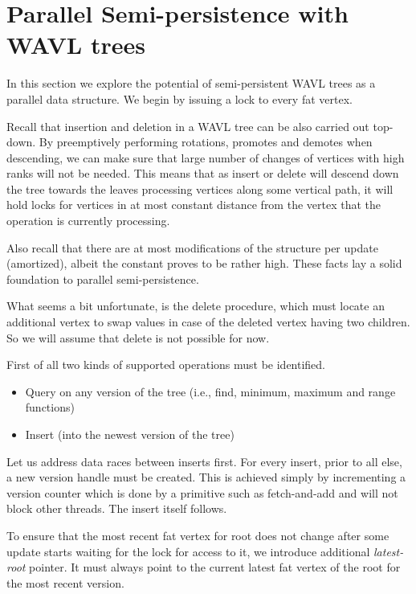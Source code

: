 \section{Parallel Semi-persistence with WAVL trees}

In this section we explore the potential of semi-persistent WAVL trees as a parallel data structure. 
We begin by issuing a lock to every fat vertex.

Recall that insertion and deletion in a WAVL tree can be also carried out top-down.
By preemptively performing rotations, promotes and demotes when descending, we can make sure that large number of changes of vertices with high ranks will not be needed. This means that as insert or delete will descend down the tree towards the leaves processing vertices along some vertical path, it will hold locks for vertices in at most constant distance from the vertex that the operation is currently processing.

Also recall that there are at most  modifications of the structure per update (amortized), albeit the constant proves to be rather high. These facts lay a solid foundation to parallel semi-persistence.

What seems a bit unfortunate, is the delete procedure, which must locate an additional vertex to swap values in case of the deleted vertex having two children. So we will assume that delete is not possible for now.

First of all two kinds of supported operations must be identified. 

\begin{itemize}
	\item Query on any version of the tree (i.e., find, minimum, maximum and range functions)
	\item Insert (into the newest version of the tree)
\end{itemize}

Let us address data races between inserts first. For every insert, prior to all else, a new version handle must be created. This is achieved simply by incrementing a version counter which is done by a primitive such as fetch-and-add and will not block other threads. The insert itself follows.

To ensure that the most recent fat vertex for root does not change after some update starts waiting for the lock for access to it, we introduce additional \emph{latest-root} pointer. It must always point to the current latest fat vertex of the root for the most recent version. 

